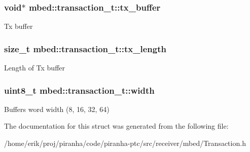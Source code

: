 \subsubsection[{\texorpdfstring{tx\+\_\+buffer}{tx_buffer}}]{\setlength{\rightskip}{0pt plus 5cm}void$\ast$ mbed\+::transaction\+\_\+t\+::tx\+\_\+buffer}\hypertarget{structmbed_1_1transaction__t_abacf8c4e26c5bee9e3f45abdb065a46c}{}\label{structmbed_1_1transaction__t_abacf8c4e26c5bee9e3f45abdb065a46c}
Tx buffer 
\subsubsection[{\texorpdfstring{tx\+\_\+length}{tx_length}}]{\setlength{\rightskip}{0pt plus 5cm}size\+\_\+t mbed\+::transaction\+\_\+t\+::tx\+\_\+length}\hypertarget{structmbed_1_1transaction__t_aa2251489b9b40afc9b6ee367d0c7746d}{}\label{structmbed_1_1transaction__t_aa2251489b9b40afc9b6ee367d0c7746d}
Length of Tx buffer 
\subsubsection[{\texorpdfstring{width}{width}}]{\setlength{\rightskip}{0pt plus 5cm}uint8\+\_\+t mbed\+::transaction\+\_\+t\+::width}\hypertarget{structmbed_1_1transaction__t_a07ac843f6ce2f59a3d65d7d8beac1f11}{}\label{structmbed_1_1transaction__t_a07ac843f6ce2f59a3d65d7d8beac1f11}
Buffer\textquotesingle{}s word width (8, 16, 32, 64) 

The documentation for this struct was generated from the following file\+:\begin{DoxyCompactItemize}
\item 
/home/erik/proj/piranha/code/piranha-\/ptc/src/receiver/mbed/Transaction.\+h\end{DoxyCompactItemize}
